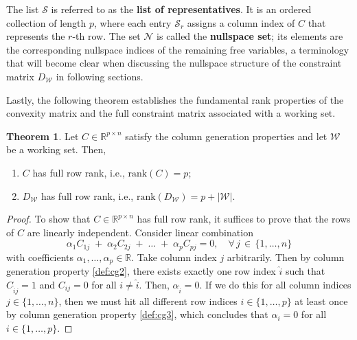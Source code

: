 \documentclass{book}
\theoremstyle{definition}
\newtheorem{theorem}{Theorem}[section]
\numberwithin{algorithm_}{chapter}
\begin{document}
The list $\mathcal{S}$ is referred to as the \textbf{list of representatives}. It is an ordered collection of length $p$, where each entry $\mathcal{S}_r$ assigns a column index of $C$ that represents the $r$-th row. The set $\mathcal{N}$ is called the \textbf{nullspace set}; its elements are the corresponding nullspace indices of the remaining free variables, a terminology that will become clear when discussing the nullspace structure of the constraint matrix $D_{\mathcal{W}}$ in following sections.


\bigskip

Lastly, the following theorem establishes the fundamental rank properties of the convexity matrix and the full constraint matrix associated with a working set.  

\begin{theorem} \label{th:rank-constraintmatrix}
Let \( C \in \mathbb{R}^{p \times n} \) satisfy the column generation properties and let $\mathcal{W}$ be a working set.
Then,
\begin{enumerate}
    \item \( C \) has full row rank, i.e., \( \mathrm{rank}(C) = p \);
    \item \( D_\mathcal{W} \) has full row rank, i.e., \( \mathrm{rank}(D_\mathcal{W}) = p + |\mathcal{W}| \).
\end{enumerate}

\begin{proof}
To show that $C \in \mathbb{R}^{p \times n}$ has full row rank, it suffices to prove that the rows of $C$ are linearly independent. Consider linear combination
\[
	\alpha_1 C_{1j} \; + \; \alpha_2 C_{2j} \; + \; \ldots \; + \; \alpha_p C_{pj} = 0, \quad \forall \, j \, \in \, \{1, \ldots, n\}
\]
with coefficients $\alpha_1, \ldots, \alpha_p \in \mathbb{R}$. Take column index $j$ arbitrarily. Then by column generation property \ref{def:cg2}, there exists exactly one row index $\hat{i}$ such that $C_{\hat{i}j} = 1$ and $C_{ij} = 0$ for all $i \neq \hat{i}$. Then, $\alpha_{\hat{i}} = 0$. If we do this for all column indices $j \in \{1, \ldots, n\}$, then we must hit all different row indices $i \in \{1, \ldots, p\}$ at least once by column generation property \ref{def:cg3}, which concludes that $\alpha_i = 0$ for all $i \in \{1, \ldots, p\}$.

\medskip


\end{proof}
\end{theorem}
\end{document}
